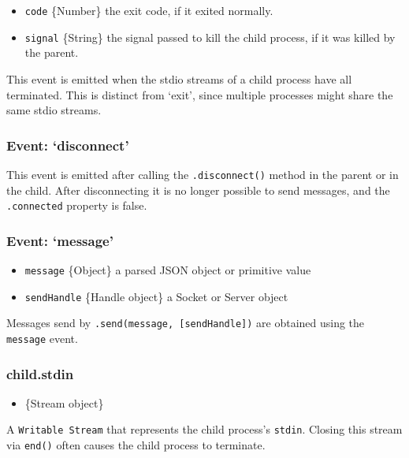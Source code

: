 \begin{itemize}
\itemsep1pt\parskip0pt
\item
  \texttt{code} \{Number\} the exit code, if it exited normally.
\item
  \texttt{signal} \{String\} the signal passed to kill the child
  process, if it was killed by the parent.
\end{itemize}

This event is emitted when the stdio streams of a child process have all
terminated. This is distinct from `exit', since multiple processes might
share the same stdio streams.

\subsubsection{Event: `disconnect'}\label{event-disconnect}

This event is emitted after calling the \texttt{.disconnect()} method in
the parent or in the child. After disconnecting it is no longer possible
to send messages, and the \texttt{.connected} property is false.

\subsubsection{Event: `message'}\label{event-message}

\begin{itemize}
\itemsep1pt\parskip0pt
\item
  \texttt{message} \{Object\} a parsed JSON object or primitive value
\item
  \texttt{sendHandle} \{Handle object\} a Socket or Server object
\end{itemize}

Messages send by \texttt{.send(message, {[}sendHandle{]})} are obtained
using the \texttt{message} event.

\subsubsection{child.stdin}\label{child.stdin}

\begin{itemize}
\itemsep1pt\parskip0pt
\item
  \{Stream object\}
\end{itemize}

A \texttt{Writable Stream} that represents the child process's
\texttt{stdin}. Closing this stream via \texttt{end()} often causes the
child process to terminate.

